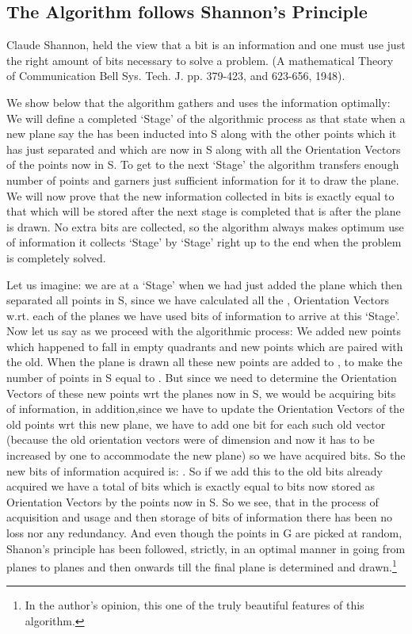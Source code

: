 \documentclass[english]{article}
\begin{document}
\subsection{The Algorithm follows Shannon's Principle}

Claude Shannon, held the view that a bit is an information and one
must use just the right amount of bits necessary to solve a problem.
(A mathematical Theory of Communication Bell Sys. Tech. J. pp. 379-423,
and 623-656, 1948).

We show below that the algorithm gathers and uses the information
optimally: We will define a completed `Stage' of the algorithmic process
as that state when a new plane say the  has been inducted
into S along with the other points which it has just separated and
which are now in S along with all the Orientation Vectors of the points
now in S. To get to the next `Stage' the algorithm transfers enough
number of points and garners just sufficient information for it to
draw the  plane. We will now prove that the new information
collected in bits is exactly equal to that which will be stored after
the next stage is completed that is after the  plane
is drawn. No extra bits are collected, so the algorithm always makes
optimum use of information it collects `Stage' by `Stage' right up
to the end when the problem is completely solved.

Let us imagine: we are at a `Stage' when we had just added the 
plane which then separated all  points in S, since we have calculated
all the , Orientation Vectors w.rt. each of the planes we have
used  bits of information to arrive at this `Stage'. Now let
us say as we proceed with the algorithmic process: We added  new
points which happened to fall in empty quadrants and  new points
which are paired with the old. When the  plane is drawn
all these  new points are added to , to make the number
of points in S equal to . But since we need to determine
the Orientation Vectors of these new points wrt the  planes
now in S, we would be acquiring  bits of information,
in addition,since we have to update the Orientation Vectors of the
old  points wrt this new plane, we have to add one bit
for each such old vector (because the old orientation vectors were
of dimension  and now it has to be increased by one to accommodate
the new plane) so we have acquired  bits. So the new bits of information
acquired is: . So if we add this to the old 
bits already acquired we have a total of 
bits which is exactly equal to  bits now stored as Orientation
Vectors by the  points now in S. So we see, that in the process
of acquisition and usage and then storage of bits of information there
has been no loss nor any redundancy. And even though the points in
G are picked at random, Shanon's principle has been followed, strictly,
in an optimal manner in going from  planes to  planes and
then onwards till the final  plane is determined and drawn.\footnote{In the author's opinion, this one of the truly beautiful features
of this algorithm.}
\end{document}
